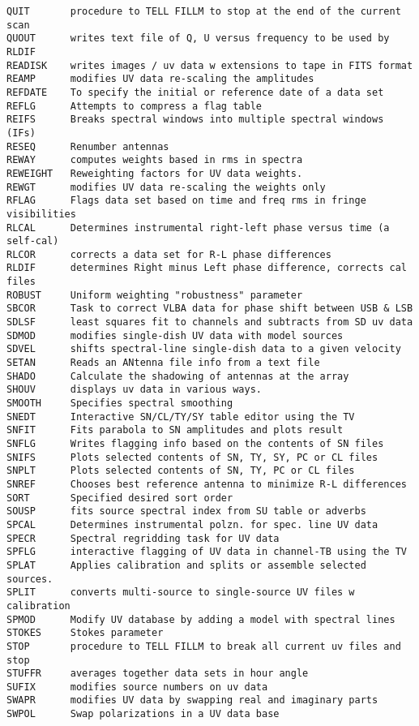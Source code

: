 \begin{verbatim}
QUIT       procedure to TELL FILLM to stop at the end of the current scan
QUOUT      writes text file of Q, U versus frequency to be used by RLDIF
READISK    writes images / uv data w extensions to tape in FITS format
REAMP      modifies UV data re-scaling the amplitudes
REFDATE    To specify the initial or reference date of a data set
REFLG      Attempts to compress a flag table
REIFS      Breaks spectral windows into multiple spectral windows (IFs)
RESEQ      Renumber antennas
REWAY      computes weights based in rms in spectra
REWEIGHT   Reweighting factors for UV data weights.
REWGT      modifies UV data re-scaling the weights only
RFLAG      Flags data set based on time and freq rms in fringe visibilities
RLCAL      Determines instrumental right-left phase versus time (a self-cal)
RLCOR      corrects a data set for R-L phase differences
RLDIF      determines Right minus Left phase difference, corrects cal files
ROBUST     Uniform weighting "robustness" parameter
SBCOR      Task to correct VLBA data for phase shift between USB & LSB
SDLSF      least squares fit to channels and subtracts from SD uv data
SDMOD      modifies single-dish UV data with model sources
SDVEL      shifts spectral-line single-dish data to a given velocity
SETAN      Reads an ANtenna file info from a text file
SHADO      Calculate the shadowing of antennas at the array
SHOUV      displays uv data in various ways.
SMOOTH     Specifies spectral smoothing
SNEDT      Interactive SN/CL/TY/SY table editor using the TV
SNFIT      Fits parabola to SN amplitudes and plots result
SNFLG      Writes flagging info based on the contents of SN files
SNIFS      Plots selected contents of SN, TY, SY, PC or CL files
SNPLT      Plots selected contents of SN, TY, PC or CL files
SNREF      Chooses best reference antenna to minimize R-L differences
SORT       Specified desired sort order
SOUSP      fits source spectral index from SU table or adverbs
SPCAL      Determines instrumental polzn. for spec. line UV data
SPECR      Spectral regridding task for UV data
SPFLG      interactive flagging of UV data in channel-TB using the TV
SPLAT      Applies calibration and splits or assemble selected sources.
SPLIT      converts multi-source to single-source UV files w calibration
SPMOD      Modify UV database by adding a model with spectral lines
STOKES     Stokes parameter
STOP       procedure to TELL FILLM to break all current uv files and stop
STUFFR     averages together data sets in hour angle
SUFIX      modifies source numbers on uv data
SWAPR      modifies UV data by swapping real and imaginary parts
SWPOL      Swap polarizations in a UV data base

\end{verbatim}
